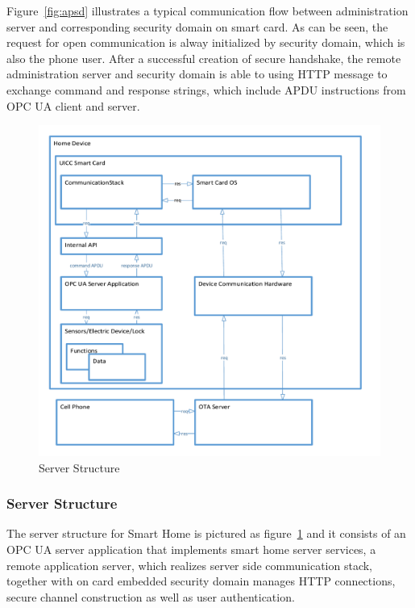 \documentclass[]{llncs}
\begin{document}
Figure~\ref{fig:apsd} illustrates a typical communication flow between administration server and corresponding security domain on smart card. As can be seen, the request for open communication is alway initialized by security domain, which is also the phone user. After a successful creation of secure handshake, the remote administration server and security domain is able to using HTTP message to exchange command and response strings, which include APDU instructions from OPC UA client and server.

\begin{figure}
	\centering
	\includegraphics[width=1.0\textwidth]{serverStructure}
		\caption[ ]{Server Structure}
	\label{fig:serverStructure}
\end{figure}
\subsubsection{Server Structure}
The server structure for Smart Home is pictured as figure~\ref{fig:serverStructure} and it consists of an OPC UA server application that implements smart home server services, a remote application server, which realizes server side communication stack, together with on card embedded security domain manages HTTP connections, secure channel construction as well as user authentication. 
\end{document}
